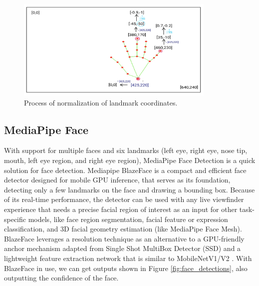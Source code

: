 \begin{figure}
	\centering
	\includegraphics[width = 0.85\textwidth]{images/normalise.pdf}
	\caption{Process of normalization of landmark coordinates.}
	\label{fig:normalization}
\end{figure}

\subsection{MediaPipe Face}
With support for multiple faces and six landmarks (left eye, right eye, nose tip, mouth, left eye region, and right eye region), MediaPipe Face Detection is a quick solution for face detection. Mediapipe BlazeFace \cite{bazarevsky2019blazeface} is a compact and efficient face detector designed for mobile GPU inference, that serves as its foundation, detecting only a few landmarks on the face and drawing a bounding box. Because of its real-time performance, the detector can be used with any live viewfinder experience that needs a precise facial region of interest as an input for other task-specific models, like face region segmentation, facial feature or expression classification, and 3D facial geometry estimation (like MediaPipe Face Mesh). BlazeFace leverages a resolution technique as an alternative to a GPU-friendly anchor mechanism adapted from Single Shot MultiBox Detector (SSD) \cite{Liu_2016} and a lightweight feature extraction network that is similar to MobileNetV1/V2 \cite{howard2017mobilenets}. With BlazeFace in use, we can get outputs shown in Figure \ref{fig:face_detections}, also outputting the confidence of the face.


